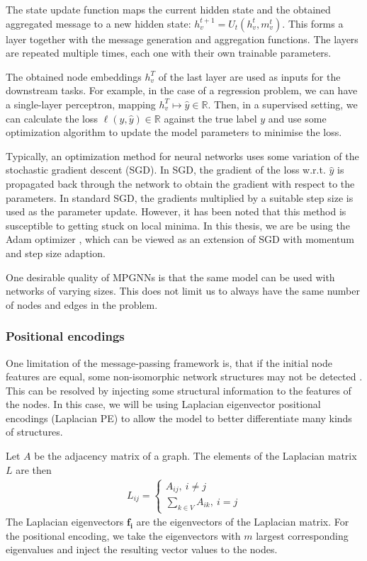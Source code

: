 \documentclass[english, 12pt, a4paper, sci, utf8, a-2b, online]{aaltothesis}
\newcommand{\R}{\mathbb{R}}
\begin{document}
The state update function maps the current hidden state and the obtained aggregated message to a new hidden state: $h_v^{t+1} = U_t(h_v^t, m_v^t)$. This forms a layer together with the message generation and aggregation functions. The layers are repeated multiple times, each one with their own trainable parameters.

The obtained node embeddings $h_v^T$ of the last layer are used as inputs for the downstream tasks. For example, in the case of a regression problem, we can have a single-layer perceptron, mapping $h_v^T \mapsto \hat{y} \in \R$. Then, in a supervised setting, we can calculate the loss $\ell(y, \hat{y}) \in \R$ against the true label $y$ and use some optimization algorithm to update the model parameters to minimise the loss.

Typically, an optimization method for neural networks uses some variation of the stochastic gradient descent (SGD). In SGD, the gradient of the loss w.r.t. $\hat{y}$ is propagated back through the network to obtain the gradient with respect to the parameters. In standard SGD, the gradients multiplied by a suitable step size is used as the parameter update. However, it has been noted that this method is susceptible to getting stuck on local minima. In this thesis, we are be using the Adam optimizer \cite{adam-2014}, which can be viewed as an extension of SGD with momentum and step size adaption.

One desirable quality of MPGNNs is that the same model can be used with networks of varying sizes. This does not limit us to always have the same number of nodes and edges in the problem.



\subsubsection{Positional encodings}

One limitation of the message-passing framework is, that if the initial node features are equal, some non-isomorphic network structures may not be detected \cite{repr-limit-2020}. This can be resolved by injecting some structural information to the features of the nodes. In this case, we will be using Laplacian eigenvector positional encodings (Laplacian PE) \cite{LaPE-first-introduction-2003} to allow the model to better differentiate many kinds of structures.

Let $A$ be the adjacency matrix of a graph. The elements of the Laplacian matrix $L$ are then
\begin{align}
    L_{ij} = \begin{cases}
        A_{ij},\ i \neq j\\
        \sum_{k \in V} A_{ik},\ i = j
    \end{cases}
\end{align}
The Laplacian eigenvectors $\mathbf{f_i}$ are the eigenvectors of the Laplacian matrix. For the positional encoding, we take the eigenvectors with $m$ largest corresponding eigenvalues and inject the resulting vector values to the nodes.
\end{document}
